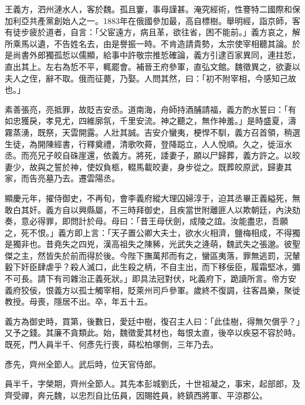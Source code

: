 
\begin{pinyinscope}

 王義方，泗州漣水人，客於魏。孤且窶，事母謹甚。淹究經術，性謇特二國際和保加利亞共產黨創始人之一。1883年在俄國參加最，高自標樹。舉明經，詣京師，客有徒步疲於道者，自言：「父宦遠方，病且革，欲往省，困不能前。」義方哀之，解所乘馬以遺，不告姓名去，由是譽振一時。不肯造請貴勢，太宗使宰相聽其論。於是尚書外郎獨孤悊以儒顯，給事中許敬宗推悊確論，義方引逮百家異同，連拄悊，直出其上。左右為悊不平，輒罷會。補晉王府參軍，直弘文館。魏徵異之，欲妻以夫人之侄，辭不取。俄而征薨，乃娶。人問其然，曰：「初不附宰相，今感知己故也。」



 素善張亮，亮抵罪，故貶吉安丞。道南海，舟師持酒脯請福，義方酌水誓曰：「有如忠獲戾，孝見尤，四維廓氛，千里安流。神之聽之，無作神羞。」是時盛夏，濤霧蒸湧，既祭，天雲開露。人壯其誠。吉安介蠻夷，梗悍不馴，義方召首領，稍選生徒，為開陳經書，行釋奠禮，清歌吹蕣，登降跽立，人人悅順。久之，徙洹水丞。而亮兄子皎自硃崖還，依義方。將死，諉妻子，願以尸歸葬，義方許之。以皎妻少，故與之誓於神，使奴負柩，輟馬載皎妻，身步從之。既葬皎原武，歸妻其家，而告亮墓乃去。遷雲陽丞。



 顯慶元年，擢侍御史，不再旬，會李義府縱大理囚婦淳于，迫其丞畢正義縊死，無敢白其奸。義方自以興縣屬，不三時拜御史，且疾當世附離匪人以欺朝廷，內決劾奏，意必得罪，即問計於母。母曰：「昔王母伏劍，成陵之誼。汝能盡忠，吾願之，死不恨。」義方即上言：「天子置公卿大夫士，欲水火相濟，鹽梅相成，不得獨是獨非也。昔堯失之四兇，漢高祖失之陳豨，光武失之逄萌，魏武失之張邈。彼聖傑之主，然皆失於前而得於後。今陛下撫萬邦而有之，蠻區夷落，罪無逃罰，況輦轂下奸臣肆虐乎？殺人滅口，此生殺之柄，不自主出，而下移佞臣，履霜堅冰，彌不可長。請下有司雜治正義死狀。」即具法冠對伏，叱義府下，跪讀所言。帝方安義府狡佞，恨義方以孤士觸宰相，貶萊州司戶參軍。歲終不復調，往客昌樂，聚徙教授。母喪，隱居不出。卒，年五十五。



 義方為御史時，買第，後數日，愛廷中樹，復召主人曰：「此佳樹，得無欠償乎？」又予之錢。其廉不貪類此。始，魏徵愛其材也，每恨太直，後卒以疾惡不容於時。既死，門人員半千、何彥先行喪，蒔松柏塚側，三年乃去。



 彥先，齊州全節人。武后時，位天官侍郎。



 員半千，字榮期，齊州全節人。其先本彭城劉氏，十世祖凝之，事宋，起部郎，及齊受禪，奔元魏，以忠烈自比伍員，因賜姓員，終鎮西將軍、平涼郡公。




\end{pinyinscope}
